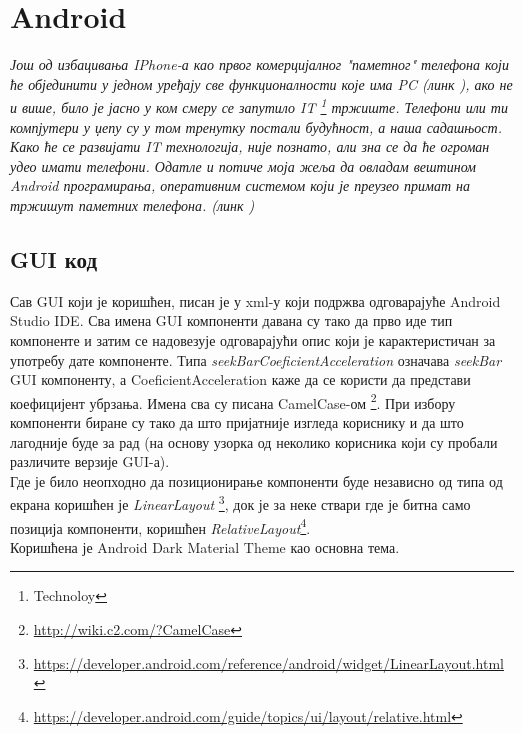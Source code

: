 \chapter{Android}\label{Android}

\emph{Још од избацивања IPhone-а као првог комерцијалног "паметног" телефона који ће објединити у једном уређају све функционалности  које има PC (линк \cite{IPHONE}), ако не и више, било је јасно у ком смеру се запутило IT \footnote{ Technoloy} тржиште. Телефони или ти компјутери у џепу су у том тренутку постали будућност, а наша садашњост. Како ће се развијати IT технологија, није познато, али зна се да ће огроман удео имати телефони. Одатле и потиче моја  жеља да овладам вештином Android програмирања, оперативним системом који је преузео примат на тржишут паметних телефона. (линк \cite{MarkShare}) }
\section{GUI код}
Сав GUI који је коришћен, писан је у xml-у који подржва одговарајуће Android Studio IDE. Сва имена GUI компоненти давана су тако да прво иде тип компоненте и затим се надовезује одговарајући опис који је карактеристичан за употребу дате компоненте. Типа \emph{seekBarCoeficientAcceleration} означава \emph{seekBar} GUI компоненту, а CoeficientAcceleration каже да се користи да представи коефицијент убрзања. Имена сва су писана CamelCase-ом \footnote{\url{http://wiki.c2.com/?CamelCase}}. При избору компоненти биране су тако да што пријатније изгледа кориснику и да што лагодније буде за рад (на основу узорка од неколико корисника који су пробали различите верзије GUI-а). 
\\ \indent 
Где је било неопходно да позиционирање компоненти буде независно од типа од екрана коришћен је \emph{LinearLayout}
\footnote{\url{https://developer.android.com/reference/android/widget/LinearLayout.html}}, 
док је за неке ствари где је битна само позиција компоненти, коришћен \emph{RelativeLayout}\footnote{\url{https://developer.android.com/guide/topics/ui/layout/relative.html}}.
\\ \indent 
Коришћена је Android Dark Material Theme као основна тема.

